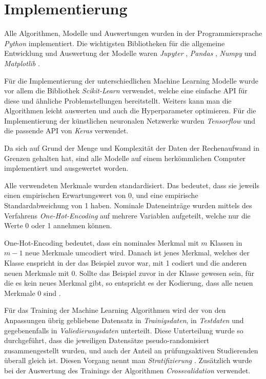 

\section{Implementierung}
\label{sec:impl}

Alle Algorithmen, Modelle und Auswertungen wurden in der Programmiersprache \textit{Python} \cite{python} implementiert. Die wichtigsten
Bibliotheken f\"ur die allgemeine Entwicklung und Auswertung der Modelle waren
\textit{Jupyter} \cite{jupyter}, \textit{Pandas} \cite{pandas}, \textit{Numpy} \cite{numpy} und \textit{Matplotlib} \cite{plt}.

F\"ur die Implementierung der unterschiedlichen Machine Learning Modelle wurde vor allem die Bibliothek \textit{Scikit-Learn} \cite{sklearn_api} verwendet, welche eine einfache API f\"ur
diese und \"ahnliche Problemstellungen bereitstellt. Weiters kann man die Algorithmen leicht auswerten und auch die Hyperparameter optimieren.
F\"ur die Implementierung der k\"unstlichen neuronalen Netzwerke wurden \textit{Tensorflow} \cite{tensorflow} und die passende API von \textit{Keras} \cite{keras} verwendet.

Da sich auf Grund der Menge und Komplexit\"at der Daten der Rechenaufwand in Grenzen gehalten hat, sind alle Modelle auf einem
herk\"ommlichen Computer implementiert und ausgewertet worden.

Alle verwendeten Merkmale wurden standardisiert. Das bedeutet, dass sie jeweils einen empirischen Erwartungswert
von 0, und eine empirische Standardabweichung von 1 haben. Nominale Dateneintr\"age wurden mittels des Verfahrens \textit{One-Hot-Encoding} auf mehrere Variablen
aufgeteilt, welche nur die Werte 0 oder 1 annehmen k\"onnen.

One-Hot-Encoding bedeutet, dass ein nominales Merkmal mit $m$ Klassen in $m-1$ neue Merkmale umcodiert wird. Danach ist jenes Merkmal, welches
der Klasse enspricht in der das Beispiel zuvor war, mit 1 codiert und die anderen neuen Merkmale mit 0. Sollte das Beispiel zuvor in der Klasse gewesen sein, f\"ur die
es kein neues Merkmal gibt, so entspricht es der Kodierung, dass alle neuen Merkmale 0 sind \cite[Seite 67]{handson}.

F\"ur das Training der Machine Learning Algorithmen wird der von den Anpassungen \"ubrig gebliebene Datensatz
in \textit{Trainigsdaten}, in \textit{Testdaten} und gegebenenfalls in \textit{Valiedierungsdaten} unterteilt.
Diese Unterteilung wurde so durchgef\"uhrt, dass die jeweiligen Datens\"atze pseudo-randomisiert zusammengestellt wurden,
und auch der Anteil an pr\"ufungsaktiven Studierenden \"uberall gleich ist. Diesen Vorgang nennt man \textit{Stratifizierung} \cite[Seite 53]{handson}. Zus\"atzlich wurde bei der Auswertung des Trainings der
Algorithmen \textit{Crossvalidation} verwendet.

